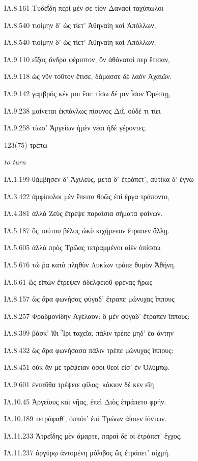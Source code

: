 \begin{enumerate}
{ΙΛ.8.161 Τυδεΐδη περὶ μέν σε τίον Δαναοὶ ταχύπωλοι

ΙΛ.8.540 τιοίμην δ' ὡς τίετ' Ἀθηναίη καὶ Ἀπόλλων,

ΙΛ.8.540 τιοίμην δ' ὡς τίετ' Ἀθηναίη καὶ Ἀπόλλων,

ΙΛ.9.110 εἴξας ἄνδρα φέριστον, ὃν ἀθάνατοί περ ἔτισαν,

ΙΛ.9.118 ὡς νῦν τοῦτον ἔτισε, δάμασσε δὲ λαὸν Ἀχαιῶν.

ΙΛ.9.142 γαμβρός κέν μοι ἔοι: τίσω δέ μιν ἶσον Ὀρέστῃ,

ΙΛ.9.238 μαίνεται ἐκπάγλως πίσυνος Διΐ, οὐδέ τι τίει

ΙΛ.9.258 τίωσ' Ἀργείων ἠμὲν νέοι ἠδὲ γέροντες.

}

\clearpage
\item[\large 123(75)]{\large \g τρέπω}

\hspace{0.2cm} \textit{ to turn }

{\g
ΙΛ.1.199 θάμβησεν δ' Ἀχιλεύς, μετὰ δ' ἐτράπετ', αὐτίκα δ' ἔγνω

ΙΛ.3.422 ἀμφίπολοι μὲν ἔπειτα θοῶς ἐπὶ ἔργα τράποντο,

ΙΛ.4.381 ἀλλὰ Ζεὺς ἔτρεψε παραίσια σήματα φαίνων.

ΙΛ.5.187 ὃς τούτου βέλος ὠκὺ κιχήμενον ἔτραπεν ἄλλῃ.

ΙΛ.5.605 ἀλλὰ πρὸς Τρῶας τετραμμένοι αἰὲν ὀπίσσω

ΙΛ.5.676 τώ ῥα κατὰ πληθὺν Λυκίων τράπε θυμὸν Ἀθήνη.

ΙΛ.6.61 ὣς εἰπὼν ἔτρεψεν ἀδελφειοῦ φρένας ἥρως

ΙΛ.8.157 ὣς ἄρα φωνήσας φύγαδ' ἔτραπε μώνυχας ἵππους

ΙΛ.8.257 Φραδμονίδην Ἀγέλαον: ὃ μὲν φύγαδ' ἔτραπεν ἵππους:

ΙΛ.8.399 βάσκ' ἴθι Ἶρι ταχεῖα, πάλιν τρέπε μηδ' ἔα ἄντην

ΙΛ.8.432 ὣς ἄρα φωνήσασα πάλιν τρέπε μώνυχας ἵππους:

ΙΛ.8.451 οὐκ ἄν με τρέψειαν ὅσοι θεοί εἰσ' ἐν Ὀλύμπῳ.

ΙΛ.9.601 ἐνταῦθα τρέψειε φίλος: κάκιον δέ κεν εἴη

ΙΛ.10.45 Ἀργείους καὶ νῆας, ἐπεὶ Διὸς ἐτράπετο φρήν.

ΙΛ.10.189 τετράφαθ', ὁππότ' ἐπὶ Τρώων ἀΐοιεν ἰόντων.

ΙΛ.11.233 Ἀτρεΐδης μὲν ἅμαρτε, παραὶ δέ οἱ ἐτράπετ' ἔγχος,

ΙΛ.11.237 ἀργύρῳ ἀντομένη μόλιβος ὣς ἐτράπετ' αἰχμή.

}
\end{enumerate}
